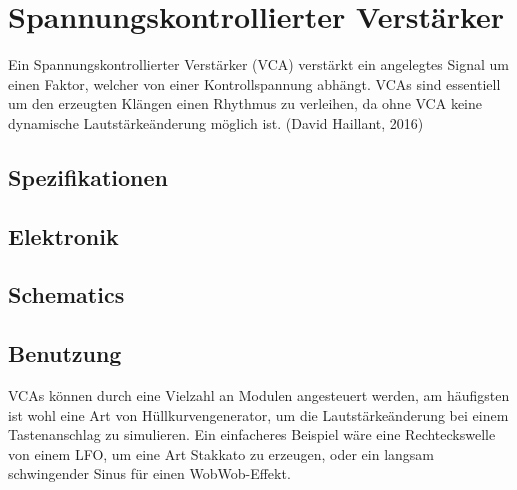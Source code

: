 
\section{Spannungskontrollierter Verstärker}
\label{sec:orgcb96987}
Ein Spannungskontrollierter Verstärker (VCA) verstärkt ein angelegtes Signal um einen Faktor, welcher von einer Kontrollspannung abhängt. VCAs sind essentiell um den erzeugten Klängen einen Rhythmus zu verleihen, da ohne VCA keine dynamische Lautstärkeänderung möglich ist. 
(David Haillant, 2016)
\subsection{Spezifikationen}
\label{sec:org7c7ed52}
\subsection{Elektronik}
\label{sec:orgcd55d86}
\subsection{Schematics}
\label{sec:orga61010d}
\subsection{Benutzung}
\label{sec:orge77f545}
VCAs können durch eine Vielzahl an Modulen angesteuert werden, am häufigsten ist wohl eine Art von Hüllkurvengenerator, um die Lautstärkeänderung bei einem Tastenanschlag zu simulieren. Ein einfacheres Beispiel wäre eine Rechteckswelle von einem LFO, um eine Art Stakkato zu erzeugen, oder ein langsam schwingender Sinus für einen WobWob-Effekt.
